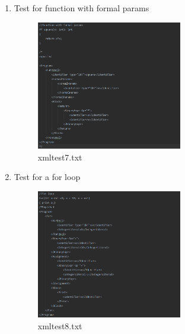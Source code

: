 \documentclass{article}
\begin{document}
\begin{enumerate}
					\item Test for function with formal params
					
									\begin{figure}[H]
					\centering
			 			\includegraphics[width=0.6\textwidth]{xmltest7.png}
			 			\centering
			  			\caption{xmltest7.txt}
			  			\label{fig:xmltest7}
					\end{figure}
					
					\item Test for a for loop
					\begin{figure}[H]
					\centering
			 			\includegraphics[width=0.6\textwidth]{xmltest8.png}
			 			\centering
			  			\caption{xmltest8.txt}
			  			\label{fig:xmltest8}
					\end{figure}

					
												

\end{enumerate}
\end{document}
